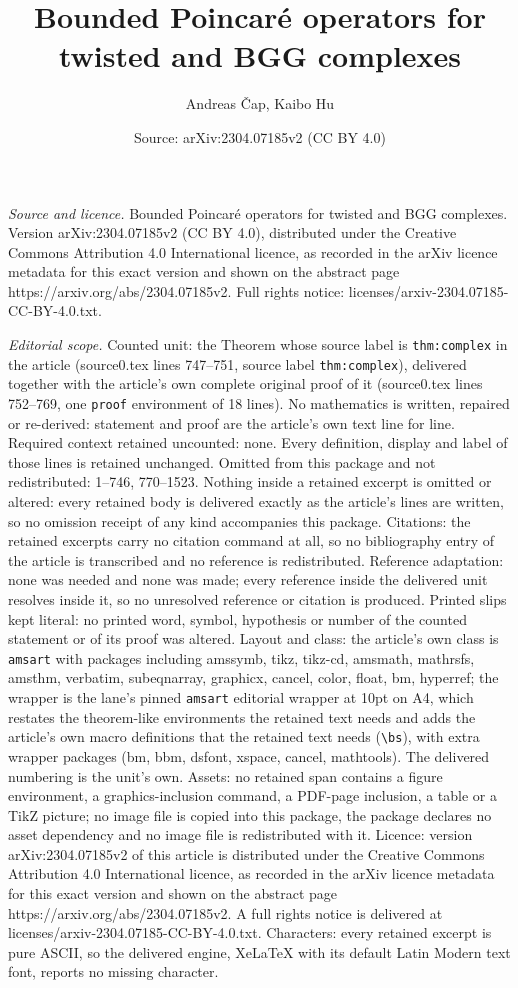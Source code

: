 \documentclass[10pt,a4paper]{amsart}
\title[Bounded Poincar\'e operators for twisted and BGG complexes]{Bounded Poincar\'e operators for twisted and BGG complexes}
\author{Andreas \v{C}ap, Kaibo Hu}
\date{Source: arXiv:2304.07185v2 (CC BY 4.0)}
\begin{document}
\maketitle

\noindent\emph{Source and licence.} Bounded Poincar\'e operators for twisted and BGG complexes. Version arXiv:2304.07185v2 (CC BY 4.0), distributed under the Creative Commons Attribution 4.0 International licence, as recorded in the arXiv licence metadata for this exact version and shown on the abstract page https://arxiv.org/abs/2304.07185v2. Full rights notice: licenses/arxiv-2304.07185-CC-BY-4.0.txt.\par\smallskip

\noindent\textit{Editorial scope.} Counted unit: the Theorem whose source label is \texttt{thm:complex} in the article (source0.tex lines 747--751, source label \texttt{thm:complex}), delivered together with the article's own complete original proof of it (source0.tex lines 752--769, one \texttt{proof} environment of 18 lines). No mathematics is written, repaired or re-derived: statement and proof are the article's own text line for line. Required context retained uncounted: none. Every definition, display and label of those lines is retained unchanged. Omitted from this package and not redistributed: 1--746, 770--1523. Nothing inside a retained excerpt is omitted or altered: every retained body is delivered exactly as the article's lines are written, so no omission receipt of any kind accompanies this package. Citations: the retained excerpts carry no citation command at all, so no bibliography entry of the article is transcribed and no reference is redistributed. Reference adaptation: none was needed and none was made; every reference inside the delivered unit resolves inside it, so no unresolved reference or citation is produced. Printed slips kept literal: no printed word, symbol, hypothesis or number of the counted statement or of its proof was altered. Layout and class: the article's own class is \texttt{amsart} with packages including amssymb, tikz, tikz-cd, amsmath, mathrsfs, amsthm, verbatim, subeqnarray, graphicx, cancel, color, float, bm, hyperref; the wrapper is the lane's pinned \texttt{amsart} editorial wrapper at 10pt on A4, which restates the theorem-like environments the retained text needs and adds the article's own macro definitions that the retained text needs (\texttt{\textbackslash bs}), with extra wrapper packages (bm, bbm, dsfont, xspace, cancel, mathtools). The delivered numbering is the unit's own. Assets: no retained span contains a figure environment, a graphics-inclusion command, a PDF-page inclusion, a table or a TikZ picture; no image file is copied into this package, the package declares no asset dependency and no image file is redistributed with it. Licence: version arXiv:2304.07185v2 of this article is distributed under the Creative Commons Attribution 4.0 International licence, as recorded in the arXiv licence metadata for this exact version and shown on the abstract page https://arxiv.org/abs/2304.07185v2. A full rights notice is delivered at licenses/arxiv-2304.07185-CC-BY-4.0.txt. Characters: every retained excerpt is pure ASCII, so the delivered engine, XeLaTeX with its default Latin Modern text font, reports no missing character.
\end{document}
